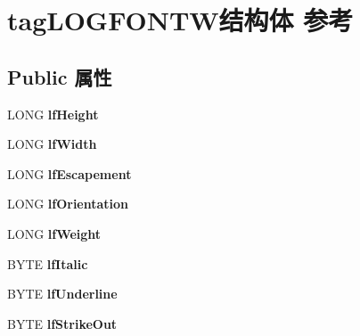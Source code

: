\hypertarget{structtag_l_o_g_f_o_n_t_w}{}\section{tag\+L\+O\+G\+F\+O\+N\+T\+W结构体 参考}
\label{structtag_l_o_g_f_o_n_t_w}
\subsection*{Public 属性}
\begin{DoxyCompactItemize}
\item 
\mbox{\label{structtag_l_o_g_f_o_n_t_w_a9c49cb0a3c45762492bb4137e6c14eb5}} 
L\+O\+NG {\bfseries lf\+Height}
\item 
\mbox{\label{structtag_l_o_g_f_o_n_t_w_a460d30beebfc7a2713374f78236d850f}} 
L\+O\+NG {\bfseries lf\+Width}
\item 
\mbox{\label{structtag_l_o_g_f_o_n_t_w_ae3bec8c800604c75eb33acd84f4c7491}} 
L\+O\+NG {\bfseries lf\+Escapement}
\item 
\mbox{\label{structtag_l_o_g_f_o_n_t_w_a905c539bcf06ab8276db51106160ca61}} 
L\+O\+NG {\bfseries lf\+Orientation}
\item 
\mbox{\label{structtag_l_o_g_f_o_n_t_w_acab21c87df8172eb750b34d8e95a9cd3}} 
L\+O\+NG {\bfseries lf\+Weight}
\item 
\mbox{\label{structtag_l_o_g_f_o_n_t_w_abb5b796d6d143e542469733c9787d591}} 
B\+Y\+TE {\bfseries lf\+Italic}
\item 
\mbox{\label{structtag_l_o_g_f_o_n_t_w_a6fec4ec4b1839f2dfb57f19d5be1066b}} 
B\+Y\+TE {\bfseries lf\+Underline}
\item 
\mbox{\label{structtag_l_o_g_f_o_n_t_w_ac7c4a468e427338cba19c13eff53ae82}} 
B\+Y\+TE {\bfseries lf\+Strike\+Out}
\item 
\mbox{\label{structtag_l_o_g_f_o_n_t_w_a48dfa89b5878c4424efde9d47a7273c9}} 

\end{DoxyCompactItemize}

